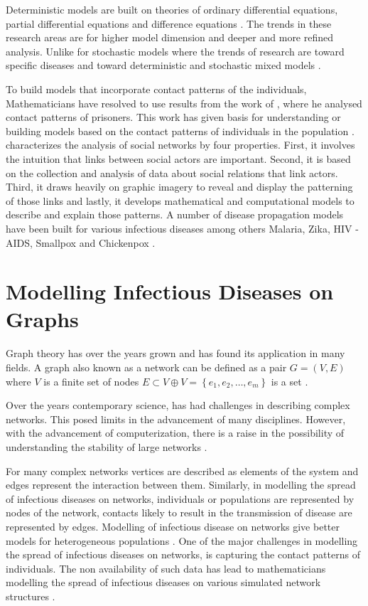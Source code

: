 Deterministic models are built on theories of ordinary differential equations, partial differential equations and difference equations \citep{keeling2008modeling}.
The trends in these research areas are for higher model dimension and deeper and more refined analysis. Unlike for stochastic models where the trends of research are
toward specific diseases and toward deterministic and stochastic mixed models \citep{fu2013propagation}.


 
 To build models that incorporate contact patterns of the individuals, Mathematicians have resolved  to use results from the work of \cite{moreno1945application}, where he analysed contact patterns of prisoners. This work has given basis for understanding or building models based on the contact patterns of individuals in the population \citep{sat}. \cite{freeman2004development} characterizes the analysis of social networks by four properties. First, it involves the intuition that links between social actors are important. Second, it is based on the collection and analysis of data about social relations that link actors. Third, it draws heavily on graphic imagery to reveal and display the patterning of those links and lastly, it develops mathematical and computational models to describe and explain those patterns. 
A number of disease propagation models have been built for various infectious diseases among others Malaria, Zika, HIV -AIDS, Smallpox  and Chickenpox \citep{ding2016mathematical}.


\section{Modelling Infectious Diseases on Graphs}
Graph theory has over the years grown and has found its application in many fields. A graph also known as a network can be defined as a pair $G = (V, E) $ where $V$ is a finite set of nodes $E \subset V \oplus V = \left\lbrace e_1,e_2,\dots, e_m \right\rbrace$ is a set \citep{estrada2012structure}.

Over the years contemporary science, has had challenges in describing complex networks. This posed limits in the advancement of many disciplines. However, with the advancement of computerization, there is a raise in the possibility of understanding the stability of large networks \cite{barabasi1999emergence}.

For many complex networks vertices are described as elements of the system and edges represent the interaction between them. Similarly, in modelling the spread of  infectious diseases on networks, individuals or populations are represented by nodes of the network, contacts likely to result in the transmission of disease are represented by edges. Modelling of infectious disease on networks give better models for heterogeneous populations \citep{ming2016stochastic}. One of the major challenges in modelling the spread of infectious diseases on networks, is capturing  the contact patterns of individuals. The non availability of such data has lead to mathematicians modelling the spread of infectious diseases on various simulated network structures \citep{pastor2001}.


